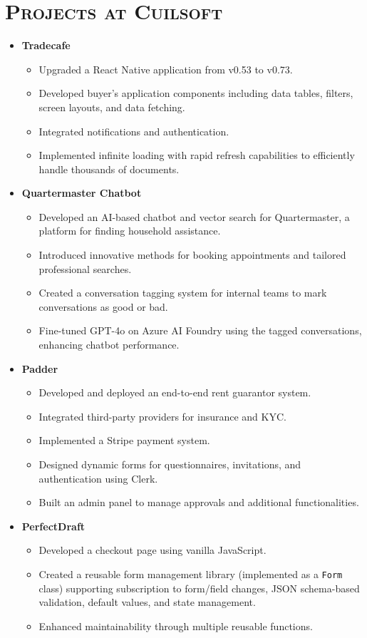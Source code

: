 \documentclass[a4paper,10pt]{article}
\newcommand{\resumesection}[1]{\section*{\scshape{#1}}}
\begin{document}
\resumesection{Projects at Cuilsoft}
\begin{itemize}[leftmargin=0.5cm]
    \item \textbf{Tradecafe}
    \begin{itemize}
       \item Upgraded a React Native application from v0.53 to v0.73.
       \item Developed buyer's application components including data tables, filters, screen layouts, and data fetching.
       \item Integrated notifications and authentication.
       \item Implemented infinite loading with rapid refresh capabilities to efficiently handle thousands of documents.
    \end{itemize}
    
    \item \textbf{Quartermaster Chatbot}
    \begin{itemize}
       \item Developed an AI-based chatbot and vector search for Quartermaster, a platform for finding household assistance.
       \item Introduced innovative methods for booking appointments and tailored professional searches.
       \item Created a conversation tagging system for internal teams to mark conversations as good or bad.
       \item Fine-tuned GPT-4o on Azure AI Foundry using the tagged conversations, enhancing chatbot performance.
    \end{itemize}
    
    \item \textbf{Padder}
    \begin{itemize}
       \item Developed and deployed an end-to-end rent guarantor system.
       \item Integrated third-party providers for insurance and KYC.
       \item Implemented a Stripe payment system.
       \item Designed dynamic forms for questionnaires, invitations, and authentication using Clerk.
       \item Built an admin panel to manage approvals and additional functionalities.
    \end{itemize}
    
    \item \textbf{PerfectDraft}
    \begin{itemize}
       \item Developed a checkout page using vanilla JavaScript.
       \item Created a reusable form management library (implemented as a \texttt{Form} class) supporting subscription to form/field changes, JSON schema-based validation, default values, and state management.
       \item Enhanced maintainability through multiple reusable functions.
    \end{itemize}
\end{itemize}
\end{document}
